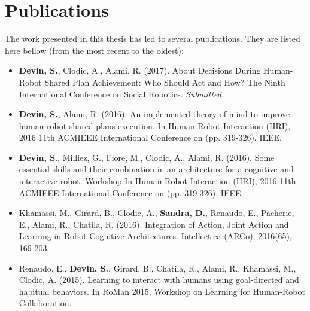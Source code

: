 \documentclass[english,a4paper,11pt,twoside]{StyleThese}
\begin{document}
\section*{Publications}

The work presented in this thesis has led to several publications. They are listed here bellow (from the most recent to the oldest):
\begin{itemize}
\item \textbf{Devin, S.}, Clodic, A., Alami, R. (2017). About Decisions During Human-Robot Shared Plan Achievement: Who Should Act and How? The Ninth International Conference on Social Robotics. \textit{Submitted}.
\item \textbf{Devin, S.}, Alami, R. (2016). An implemented theory of mind to improve human-robot shared plans execution. In Human-Robot Interaction (HRI), 2016 11th ACM\/IEEE International Conference on (pp. 319-326). IEEE.
\item \textbf{Devin, S}., Milliez, G., Fiore, M., Clodic, A., Alami, R. (2016). Some essential skills and their combination in an architecture for a cognitive and interactive robot. Workshop In Human-Robot Interaction (HRI), 2016 11th ACM\/IEEE International Conference on (pp. 319-326). IEEE.
\item Khamassi, M., Girard, B., Clodic, A., \textbf{Sandra, D.}, Renaudo, E., Pacherie, E., Alami, R., Chatila, R. (2016). Integration of Action, Joint Action and Learning in Robot Cognitive Architectures. Intellectica (ARCo), 2016(65), 169-203.
\item Renaudo, E., \textbf{Devin, S.}, Girard, B., Chatila, R., Alami, R., Khamassi, M., Clodic, A. (2015). Learning to interact with humans using goal-directed and habitual behaviors. In RoMan 2015, Workshop on Learning for Human-Robot Collaboration.
\end{itemize}


\ifdefined{}
\else


\end{document}
